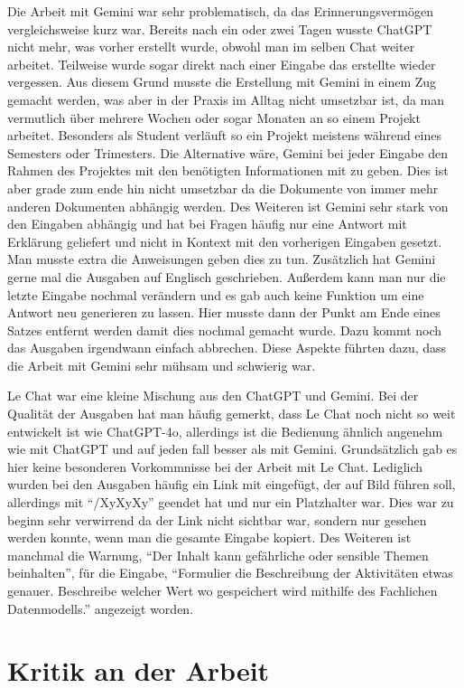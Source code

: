 Die Arbeit mit Gemini war sehr problematisch, da das Erinnerungsvermögen vergleichsweise kurz war. Bereits nach ein oder 
zwei Tagen wusste ChatGPT nicht mehr, was vorher erstellt wurde, obwohl man im selben Chat weiter arbeitet. Teilweise 
wurde sogar direkt nach einer Eingabe das erstellte wieder vergessen. Aus diesem Grund musste die Erstellung mit Gemini 
in einem Zug gemacht werden, was aber in der Praxis im Alltag nicht umsetzbar ist, da man vermutlich über mehrere Wochen 
oder sogar Monaten an so einem Projekt arbeitet. Besonders als Student verläuft so ein Projekt meistens während eines Semesters oder 
Trimesters. Die Alternative wäre, Gemini bei jeder Eingabe den Rahmen des Projektes mit den benötigten Informationen mit zu geben.
Dies ist aber grade zum ende hin nicht umsetzbar da die Dokumente von immer mehr anderen Dokumenten abhängig werden.
Des Weiteren ist Gemini sehr stark von den Eingaben abhängig und hat bei Fragen häufig nur eine Antwort mit Erklärung 
geliefert und nicht in Kontext mit den vorherigen Eingaben gesetzt. Man musste extra die Anweisungen geben dies zu tun.
Zusätzlich hat Gemini gerne mal die Ausgaben auf Englisch geschrieben. Außerdem kann man nur die letzte Eingabe nochmal verändern 
und es gab auch keine Funktion um eine Antwort neu generieren zu lassen. Hier musste dann der Punkt am Ende eines Satzes entfernt werden 
damit dies nochmal gemacht wurde. Dazu kommt noch das Ausgaben irgendwann einfach abbrechen. Diese Aspekte führten dazu, dass die Arbeit mit 
Gemini sehr mühsam und schwierig war. 

Le Chat war eine kleine Mischung aus den ChatGPT und Gemini. Bei der Qualität der Ausgaben hat man häufig gemerkt, dass Le Chat
noch nicht so weit entwickelt ist wie ChatGPT-4o, allerdings ist die Bedienung ähnlich angenehm wie mit ChatGPT und auf jeden fall 
besser als mit Gemini. Grundsätzlich gab es hier keine besonderen Vorkommnisse bei der Arbeit mit Le Chat. Lediglich wurden bei den 
Ausgaben häufig ein Link mit eingefügt, der auf Bild führen soll, allerdings mit ``/XyXyXy'' geendet hat und nur ein Platzhalter war.
Dies war zu beginn sehr verwirrend da der Link nicht sichtbar war, sondern nur gesehen werden konnte, wenn man die gesamte Eingabe kopiert.
Des Weiteren ist manchmal die Warnung, ``Der Inhalt kann gefährliche oder sensible Themen beinhalten'', für die Eingabe, 
``Formulier die Beschreibung der Aktivitäten etwas genauer. Beschreibe welcher Wert wo gespeichert wird mithilfe des Fachlichen 
Datenmodells.'' angezeigt worden. 

\section{Kritik an der Arbeit}  \label{Kritik an der Arbeit}

